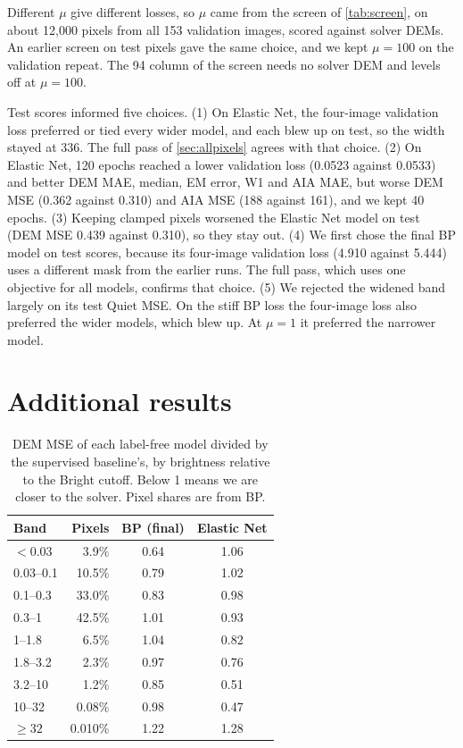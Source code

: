 Different $\mu$ give different losses, so $\mu$ came from the screen of \cref{tab:screen}, on about 12,000 pixels from all 153 validation images, scored against solver DEMs. An earlier screen on test pixels gave the same choice, and we kept $\mu=100$ on the validation repeat. The 94\Ang{} column of the screen needs no solver DEM and levels off at $\mu=100$.

Test scores informed five choices. (1) On Elastic Net, the four-image validation loss preferred or tied every wider model, and each blew up on test, so the width stayed at 336. The full pass of \cref{sec:allpixels} agrees with that choice. (2) On Elastic Net, 120 epochs reached a lower validation loss (0.0523 against 0.0533) and better DEM MAE, median, EM error, W1 and AIA MAE, but worse DEM MSE (0.362 against 0.310) and AIA MSE (188 against 161), and we kept 40 epochs. (3) Keeping clamped pixels worsened the Elastic Net model on test (DEM MSE 0.439 against 0.310), so they stay out. (4) We first chose the final BP model on test scores, because its four-image validation loss (4.910 against 5.444) uses a different mask from the earlier runs. The full pass, which uses one objective for all models, confirms that choice. (5) We rejected the widened band largely on its test Quiet MSE. On the stiff BP loss the four-image loss also preferred the wider models, which blew up. At $\mu=1$ it preferred the narrower model.

\section{Additional results}
\label{app:results}

\begin{table}[h]
\centering
\small
\caption{DEM MSE of each label-free model divided by the supervised baseline's, by brightness relative to the Bright cutoff. Below 1 means we are closer to the solver. Pixel shares are from BP.}
\label{tab:bands}
\begin{tabular}{@{}lrcc@{}}
\toprule
Band & Pixels & BP (final) & Elastic Net\\
\midrule
$<0.03$ & 3.9\% & 0.64 & 1.06\\
0.03--0.1 & 10.5\% & 0.79 & 1.02\\
0.1--0.3 & 33.0\% & 0.83 & 0.98\\
0.3--1 & 42.5\% & 1.01 & 0.93\\
1--1.8 & 6.5\% & 1.04 & 0.82\\
1.8--3.2 & 2.3\% & 0.97 & 0.76\\
3.2--10 & 1.2\% & 0.85 & 0.51\\
10--32 & 0.08\% & 0.98 & 0.47\\
$\ge 32$ & 0.010\% & 1.22 & 1.28\\
\bottomrule
\end{tabular}
\end{table}

